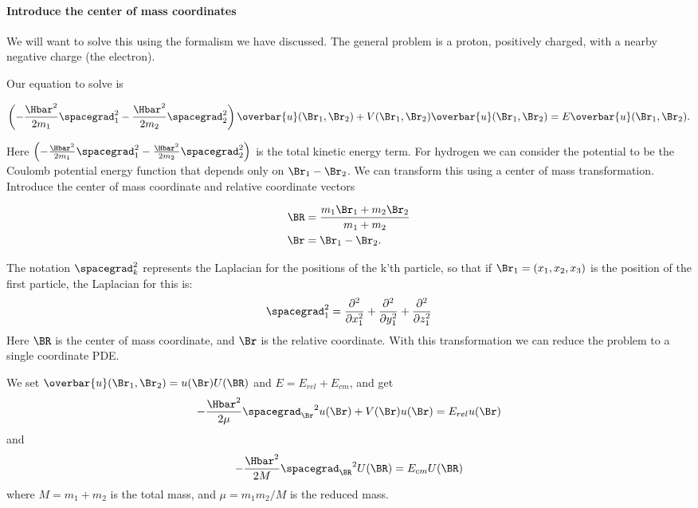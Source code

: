 %
%
%
\paragraph{Introduce the center of mass coordinates}

We will want to solve this using the formalism we have discussed.  The general problem is a proton, positively charged, with a nearby negative charge (the electron).

Our equation to solve is

\begin{align}\label{eqn:PHY356Lecture10:50}
\left(
-\frac{\Hbar^2}{2 m_1} \spacegrad_1^2
-\frac{\Hbar^2}{2 m_2} \spacegrad_2^2
\right)
\overbar{u}(\Br_1, \Br_2) +
V(\Br_1, \Br_2)
\overbar{u}(\Br_1, \Br_2)
=
E \overbar{u}(\Br_1, \Br_2).
\end{align}

Here \(\left( -\frac{\Hbar^2}{2 m_1} \spacegrad_1^2 -\frac{\Hbar^2}{2 m_2} \spacegrad_2^2 \right)\) is the total kinetic energy term.
For hydrogen we can consider the potential to be the Coulomb potential energy function that depends only on \(\Br_1 - \Br_2\).  We can transform this using a center of mass transformation.  Introduce the center of mass coordinate and relative coordinate vectors

\begin{align}\label{eqn:PHY356Lecture10:51}
\BR &= \frac{m_1 \Br_1 + m_2 \Br_2}{ m_1 + m_2 } \\
\Br &= \Br_1 - \Br_2.
\end{align}

The notation \(\spacegrad_k^2\) represents the Laplacian for the positions of the k'th particle, so that if \(\Br_1 = (x_1, x_2, x_3)\) is the position of the first particle, the Laplacian for this is:
%
\begin{equation}\label{eqn:PHY356FLecture10:52}
\spacegrad_1^2
=
\frac{\partial^2}{\partial x_1^2}
+\frac{\partial^2}{\partial y_1^2}
+\frac{\partial^2}{\partial z_1^2}
\end{equation}
%
Here \(\BR\) is the center of mass coordinate, and \(\Br\) is the relative coordinate.  With this transformation we can reduce the problem to a single coordinate PDE.

We set \(\overbar{u}(\Br_1, \Br_2) = u(\Br) U(\BR)\) and \(E = E_{rel} + E_{cm}\), and get
%
\begin{equation}\label{eqn:PHY356FLecture10:10}
-\frac{\Hbar^2}{2\mu} {\spacegrad_{\Br}}^2 u(\Br) + V(\Br) u(\Br) = E_{rel} u(\Br)
\end{equation}
and
\begin{equation}\label{eqn:PHY356FLecture10:20}
-\frac{\Hbar^2}{2M} {\spacegrad_{\BR}}^2 U(\BR) = E_{cm} U(\BR)
\end{equation}
%
where \(M = m_1 + m_2\) is the total mass, and \(\mu = m_1 m_2/M\) is the reduced mass.

